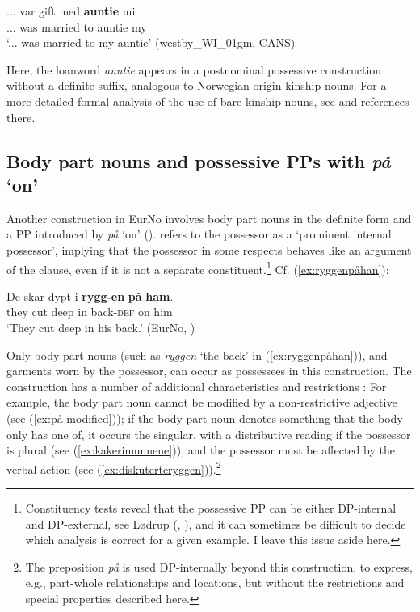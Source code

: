 \documentclass[output=paper,colorlinks,citecolor=brown]{langscibook}
\begin{document}
\ea 
\label{ex:auntie} \gll ... var gift med \textbf{auntie} mi\\
... was married to auntie my\\
\glt `... was married to my auntie' (westby\_WI\_01gm, CANS) \\
\z 

\noindent Here, the loanword \emph{auntie} appears in a postnominal possessive construction without a definite suffix, analogous to Norwegian-origin kinship nouns. For a more detailed formal analysis of the use of bare kinship nouns, see \citet{kinn2021split} and references there.

\subsection{Body part nouns and possessive PPs with \emph{på} `on'}\label{sec:bodypart-på}
Another construction in EurNo involves body part nouns in the definite form and a PP introduced by \emph{på} `on' (\citealt{lødrup2009external, lodrup2018prominent, johannessenjulienlødrup2014menneskesentrert}). \citet{lodrup2018prominent} refers to the possessor as a `prominent internal possessor', implying that the possessor in some respects behaves like an argument of the clause, even if it is not a separate constituent.\footnote{Constituency tests reveal that the possessive PP can be either DP-internal and DP-external, see Lødrup (\citeyear{lødrup2009external}, \citeyear{lodrup2018prominent}), and it can sometimes be difficult to decide which analysis is correct for a given example. I leave this issue aside here.}  Cf. (\ref{ex:ryggenpåhan}):

\ea \label{ex:ryggenpåhan} \gll De skar dypt i \textbf{rygg-en} \textbf{på} \textbf{ham}.\\
they cut deep in back-\textsc{def} on him\\
\glt `They cut deep in his back.' (EurNo, \citealt[238]{lodrup2018prominent}) 
\z 


\noindent Only body part nouns (such as \emph{ryggen} `the back' in (\ref{ex:ryggenpåhan})), and garments worn by the possessor, can occur as possessees in this construction. The construction has a number of additional characteristics and restrictions \citep[235--238]{lodrup2018prominent}: For example, the body part noun cannot be modified by a non-restrictive adjective (see (\ref{ex:på-modified})); if the body part noun denotes something that the body only has one of, it occurs the singular, with a distributive reading if the possessor is plural (see (\ref{ex:kakerimunnene})), and the possessor must be affected by the verbal action (see (\ref{ex:diskuterteryggen})).\footnote{The preposition \emph{på} is  used DP-internally beyond this construction, to express, e.g., part-whole relationships and locations, but without the restrictions and special properties described here.}   
\end{document}
